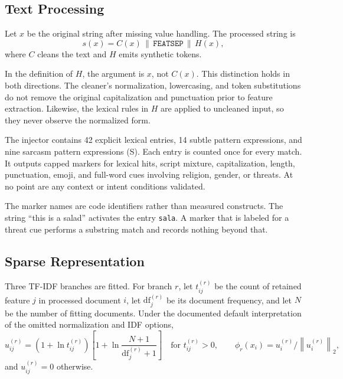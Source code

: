 \documentclass[runningheads]{llncs}
\begin{document}
\subsection{Text Processing}

Let $x$ be the original string after missing value handling. The processed string is
\begin{equation}
s(x) = C(x) \,\|\, \texttt{FEATSEP} \,\|\, H(x),
\end{equation}
where $C$ cleans the text and $H$ emits synthetic tokens.

In the definition of $H$, the argument is $x$, not $C(x)$. This distinction holds in both directions. The cleaner’s normalization, lowercasing, and token substitutions do not remove the original capitalization and punctuation prior to feature extraction. Likewise, the lexical rules in $H$ are applied to uncleaned input, so they never observe the normalized form.

The injector contains 42 explicit lexical entries, 14 subtle pattern expressions, and nine sarcasm pattern expressions (S). Each entry is counted once for every match. It outputs capped markers for lexical hits, script mixture, capitalization, length, punctuation, emoji, and full-word cues involving religion, gender, or threats. At no point are any context or intent conditions validated.

The marker names are code identifiers rather than measured constructs. The string ``this is a salad'' activates the entry \texttt{sala}. A marker that is labeled for a threat cue performs a substring match and records nothing beyond that.

\subsection{Sparse Representation}

Three TF-IDF branches are fitted. For branch $r$, let $t^{(r)}_{ij}$ be the count of retained feature $j$ in processed document $i$, let $\mathrm{df}^{(r)}_j$ be its document frequency, and let $N$ be the number of fitting documents. Under the documented default interpretation of the omitted normalization and IDF options,
\begin{equation}
u^{(r)}_{ij} = \left(1 + \ln t^{(r)}_{ij}\right)\left[1 + \ln \frac{N+1}{\mathrm{df}^{(r)}_j + 1}\right] \quad \text{for } t^{(r)}_{ij} > 0,
\qquad
\phi_r(x_i) = u^{(r)}_i \big/ \left\|u^{(r)}_i\right\|_2,
\end{equation}
and $u^{(r)}_{ij} = 0$ otherwise.
\end{document}
